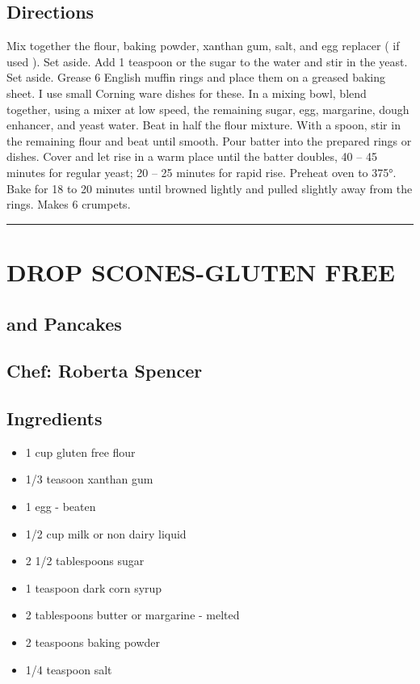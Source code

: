 \documentclass[
]{book}
\providecommand{\tightlist}{%
  \setlength{\itemsep}{0pt}\setlength{\parskip}{0pt}}
\begin{document}
\hypertarget{directions-76}{%
\subsection*{Directions}\label{directions-76}}


Mix together the flour, baking powder, xanthan gum, salt, and egg replacer ( if used ). Set aside. Add 1 teaspoon or the sugar to the water and stir in the yeast. Set aside. Grease 6 English muffin rings and place them on a greased baking sheet. I use small Corning ware dishes for these. In a mixing bowl, blend together, using a mixer at low speed, the remaining sugar, egg, margarine, dough enhancer, and yeast water. Beat in half the flour mixture. With a spoon, stir in the remaining flour and beat until smooth. Pour batter into the prepared rings or dishes. Cover and let rise in a warm place until the batter doubles, 40 -- 45 minutes for regular yeast; 20 -- 25 minutes for rapid rise. Preheat oven to 375°. Bake for 18 to 20 minutes until browned lightly and pulled slightly away from the rings. Makes 6 crumpets.

\begin{center}\rule{0.5\linewidth}{0.5pt}\end{center}

\hypertarget{drop-scones-gluten-free}{%
\section*{DROP SCONES-GLUTEN FREE}\label{drop-scones-gluten-free}}


\hypertarget{and-pancakes}{%
\subsection*{and Pancakes}\label{and-pancakes}}


\hypertarget{chef-roberta-spencer-26}{%
\subsection*{Chef: Roberta Spencer}\label{chef-roberta-spencer-26}}


\hypertarget{ingredients-77}{%
\subsection*{Ingredients}\label{ingredients-77}}


\begin{itemize}
\tightlist
\item
  1 cup gluten free flour
\item
  1/3 teasoon xanthan gum
\item
  1 egg - beaten
\item
  1/2 cup milk or non dairy liquid
\item
  2 1/2 tablespoons sugar
\item
  1 teaspoon dark corn syrup
\item
  2 tablespoons butter or margarine - melted
\item
  2 teaspoons baking powder
\item
  1/4 teaspoon salt
\end{itemize}
\end{document}
